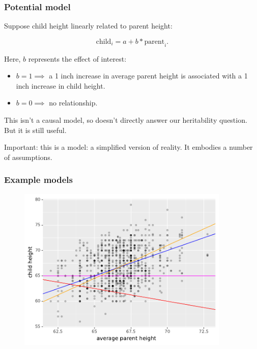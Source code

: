 \documentclass[handout]{beamer}
\begin{document}
\begin{frame}
	\frametitle{Potential model}
	
	Suppose child height linearly related to parent height:
	
	\begin{equation}
	\text{child}_i = a + b * \text{parent}_i.
	\end{equation}
	
	Here, $b$ represents the effect of interest:
	
	\begin{itemize}
		\item $b=1 \implies$ a 1 inch increase in average parent height is associated with a 1 inch increase in child height.
		\item $b=0 \implies$ no relationship.
	\end{itemize}
	
	This isn't a causal model, so doesn't directly answer our heritability question. But it is still useful.
	
	\vspace{0.5cm}
	
	Important: this is a model: a simplified version of reality. It embodies a number of assumptions.
	
\end{frame}

\begin{frame}
	\frametitle{Example models}
	
	\begin{figure}[ht]
		\centerline{\includegraphics[width=0.9\textwidth]{../figures/galton_example_lines.pdf}}
	\end{figure}
	
\end{frame}
\end{document}
